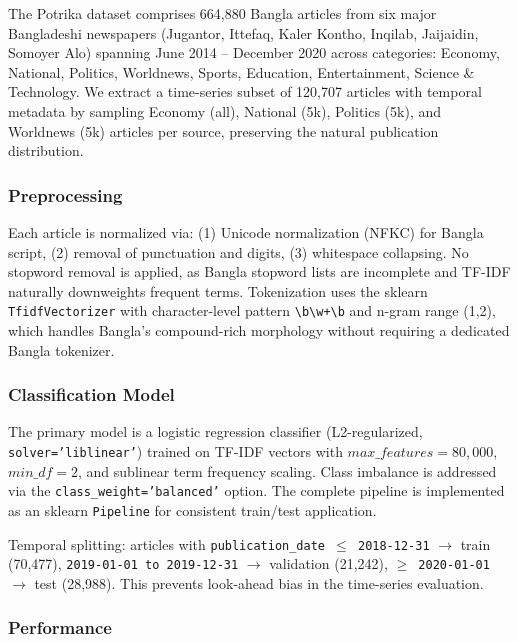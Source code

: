 \documentclass[11pt]{article}
\begin{document}
The Potrika dataset comprises 664,880 Bangla articles from six major Bangladeshi newspapers (Jugantor, Ittefaq, Kaler Kontho, Inqilab, Jaijaidin, Somoyer Alo) spanning June 2014 -- December 2020 across categories: Economy, National, Politics, Worldnews, Sports, Education, Entertainment, Science \& Technology. We extract a time-series subset of 120,707 articles with temporal metadata by sampling Economy (all), National (5k), Politics (5k), and Worldnews (5k) articles per source, preserving the natural publication distribution.

\subsubsection{Preprocessing}

Each article is normalized via: (1) Unicode normalization (NFKC) for Bangla script, (2) removal of punctuation and digits, (3) whitespace collapsing. No stopword removal is applied, as Bangla stopword lists are incomplete and TF-IDF naturally downweights frequent terms. Tokenization uses the sklearn \texttt{TfidfVectorizer} with character-level pattern \texttt{\textbackslash b\textbackslash w+\textbackslash b} and n-gram range (1,2), which handles Bangla's compound-rich morphology without requiring a dedicated Bangla tokenizer.

\subsubsection{Classification Model}

The primary model is a logistic regression classifier (L2-regularized, \texttt{solver='liblinear'}) trained on TF-IDF vectors with \(max\_features = 80{,}000\), \(min\_df = 2\), and sublinear term frequency scaling. Class imbalance is addressed via the \texttt{class\_weight='balanced'} option. The complete pipeline is implemented as an sklearn \texttt{Pipeline} for consistent train/test application.

Temporal splitting: articles with \texttt{publication\_date \(\leq\) 2018-12-31} \(\rightarrow\) train (70,477), \texttt{2019-01-01 to 2019-12-31} \(\rightarrow\) validation (21,242), \texttt{\(\geq\) 2020-01-01} \(\rightarrow\) test (28,988). This prevents look-ahead bias in the time-series evaluation.

\subsubsection{Performance}
\end{document}
